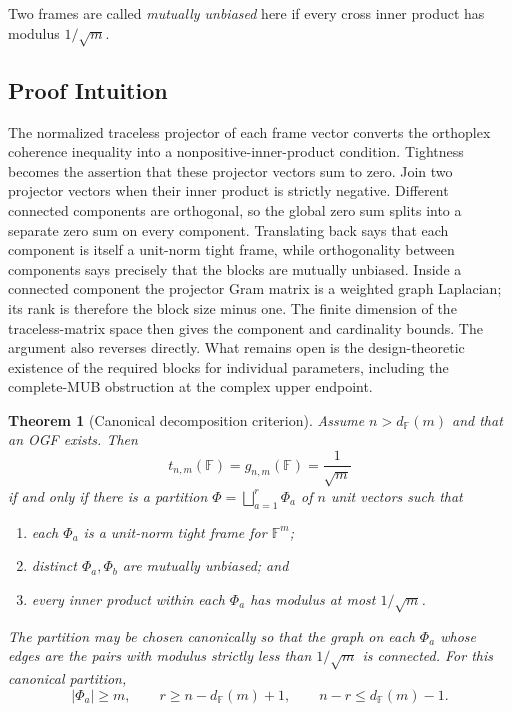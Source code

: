 \documentclass[10pt]{article}
\newtheorem{theorem}{Theorem}
\newcommand{\F}{\mathbb F}
\begin{document}
Two frames are called \emph{mutually unbiased} here if every cross inner
product has modulus $1/\sqrt m$.

\subsection*{Proof Intuition}

The normalized traceless projector of each frame vector converts the
orthoplex coherence inequality into a nonpositive-inner-product condition.
Tightness becomes the assertion that these projector vectors sum to zero.
Join two projector vectors when their inner product is strictly negative.
Different connected components are orthogonal, so the global zero sum splits
into a separate zero sum on every component.  Translating back says that each
component is itself a unit-norm tight frame, while orthogonality between
components says precisely that the blocks are mutually unbiased.  Inside a
connected component the projector Gram matrix is a weighted graph Laplacian;
its rank is therefore the block size minus one.  The finite dimension of the
traceless-matrix space then gives the component and cardinality bounds.  The
argument also reverses directly.  What remains open is the design-theoretic
existence of the required blocks for individual parameters, including the
complete-MUB obstruction at the complex upper endpoint.

\begin{theorem}[Canonical decomposition criterion]\label{thm:main}
Assume $n>d_{\F}(m)$ and that an OGF exists.  Then
\begin{equation}\label{eq:equality}
 t_{n,m}(\F)=g_{n,m}(\F)=\frac1{\sqrt m}
\end{equation}
if and only if there is a partition
$\Phi=\bigsqcup_{a=1}^r\Phi_a$ of $n$ unit vectors such that
\begin{enumerate}
\item each $\Phi_a$ is a unit-norm tight frame for $\F^m$;
\item distinct $\Phi_a,\Phi_b$ are mutually unbiased; and
\item every inner product within each $\Phi_a$ has modulus at most
      $1/\sqrt m$.
\end{enumerate}
The partition may be chosen canonically so that the graph on each $\Phi_a$
whose edges are the pairs with modulus \emph{strictly less} than
$1/\sqrt m$ is connected.  For this canonical partition,
\begin{equation}\label{eq:counts}
 |\Phi_a|\geq m,
 \qquad
 r\geq n-d_{\F}(m)+1,
 \qquad
 n-r\leq d_{\F}(m)-1.
\end{equation}
\end{theorem}
\end{document}
